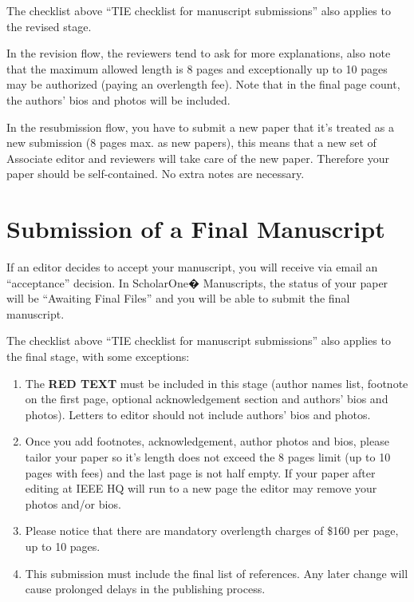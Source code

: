 \documentclass[journal]{IEEEtranTIE}
\begin{document}
The checklist above ``TIE checklist for manuscript submissions'' also applies to the revised stage.

In the revision flow, the reviewers tend to ask for more explanations, also note that the maximum allowed length is 8 pages and exceptionally up to 10 pages may be authorized (paying an overlength fee). Note that in the final page count, the authors' bios and photos will be included.

In the resubmission flow, you have to submit a new paper that it's treated as a new submission (8 pages max. as new papers), this means that a new set of Associate editor and reviewers will take care of the new paper. Therefore your paper should be self-contained. No extra notes are necessary.


\section{Submission of a Final Manuscript}

If an editor decides to accept your manuscript, you will receive via email an ``acceptance'' decision. In ScholarOne� Manuscripts, the status of your paper will be ``Awaiting Final Files'' and you will be able to submit the final manuscript.

The checklist above ``TIE checklist for manuscript submissions'' also applies to the final stage, with some exceptions:

\begin{enumerate}[1)]
	\item The {\color{red} \textbf{RED TEXT}} must be included in this stage (author names list, footnote on the first page, optional acknowledgement section and authors' bios and photos). Letters to editor should not include authors' bios and photos.
	\item Once you add footnotes, acknowledgement, author photos and bios, please tailor your paper so it's length does not exceed the 8 pages limit (up to 10 pages with fees) and the last page is not half empty. If your paper after editing at IEEE HQ will run to a new page the editor may remove your photos and/or bios.
	\item Please notice that there are mandatory overlength charges of \$160 per page, up to 10 pages.
	\item This submission must include the final list of references. Any later change will cause prolonged delays in the publishing process.
\end{enumerate}
\end{document}
